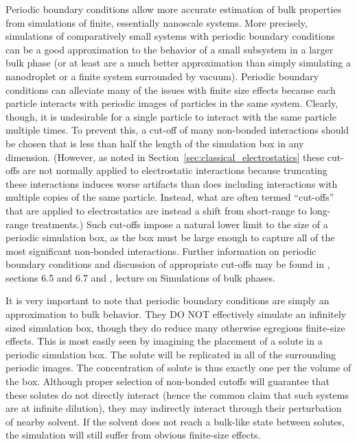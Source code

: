 \documentclass[9pt,bestpractices]{livecoms}
\begin{document}
Periodic boundary conditions allow more accurate estimation of bulk properties from simulations of finite, essentially nanoscale systems.
More precisely, simulations of comparatively small systems with periodic boundary conditions can be a good approximation to the behavior of a small subsystem in a larger bulk phase (or at least are a much better approximation than simply simulating a nanodroplet or a finite system surrounded by vacuum).
Periodic boundary conditions can alleviate many of the issues with finite size effects because each particle interacts with periodic images of particles in the same system.
Clearly, though, it is undesirable for a single particle to interact with the same particle multiple times.
To prevent this, a cut-off of many non-bonded interactions should be chosen that is less than half the length of the simulation box in any dimension.
(However, as noted in Section~\ref{sec:classical_electrostatics} these cut-offs are not normally applied to electrostatic interactions because truncating these interactions induces worse artifacts than does including interactions with multiple copies of the same particle. 
Instead, what are often termed ``cut-offs'' that are applied to electrostatics are instead a shift from short-range to long-range treatments.)
Such cut-offs impose a natural lower limit to the size of a periodic simulation box, as the box must be large enough to capture all of the most significant non-bonded interactions.
Further information on periodic boundary conditions and discussion of appropriate cut-offs may be found in \citet{LeachBook}, sections 6.5 and 6.7 and \citet{ShellNotes}, lecture on Simulations of bulk phases.

It is very important to note that periodic boundary conditions are simply an approximation to bulk behavior.
They DO NOT effectively simulate an infinitely sized simulation box, though they do reduce many otherwise egregious finite-size effects.
This is most easily seen by imagining the placement of a solute in a periodic simulation box.
The solute will be replicated in all of the surrounding periodic images.
The concentration of solute is thus exactly one per the volume of the box.
Although proper selection of non-bonded cutoffs will guarantee that these solutes do not directly interact (hence the common claim that such systems are at infinite dilution), they may indirectly interact through their perturbation of nearby solvent.
If the solvent does not reach a bulk-like state between solutes, the simulation will still suffer from obvious finite-size effects.
\end{document}
